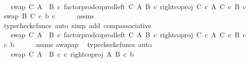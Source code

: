 \begin{isabellebody}
\ \ \isamarkupfalse%
\ \isamarkupfalse%
\ {\isachardoublequoteopen}{\isachardot}{\kern0pt}{\isachardot}{\kern0pt}{\isachardot}{\kern0pt}\ {\isacharequal}{\kern0pt}\ swap\ C\ {\isacharparenleft}{\kern0pt}A\ {\isasymCoprod}\ B{\isacharparenright}{\kern0pt}\ {\isasymcirc}\isactrlsub c\ factor{\isacharunderscore}{\kern0pt}prod{\isacharunderscore}{\kern0pt}coprod{\isacharunderscore}{\kern0pt}left\ C\ A\ B\ {\isasymcirc}\isactrlsub c\ right{\isacharunderscore}{\kern0pt}coproj\ {\isacharparenleft}{\kern0pt}C\ {\isasymtimes}\isactrlsub c\ A{\isacharparenright}{\kern0pt}\ {\isacharparenleft}{\kern0pt}C\ {\isasymtimes}\isactrlsub c\ B{\isacharparenright}{\kern0pt}\ {\isasymcirc}\isactrlsub c\ swap\ B\ C\ {\isasymcirc}\isactrlsub c\ {\isasymlangle}b{\isacharcomma}{\kern0pt}\ c{\isasymrangle}{\isachardoublequoteclose}\isanewline
\ \ \ \ \isamarkupfalse%
\ assms\ \isamarkupfalse%
\ {\isacharparenleft}{\kern0pt}typecheck{\isacharunderscore}{\kern0pt}cfuncs{\isacharcomma}{\kern0pt}\ auto\ simp\ add{\isacharcolon}{\kern0pt}\ comp{\isacharunderscore}{\kern0pt}associative{}{\isacharparenright}{\kern0pt}\isanewline
\ \ \isamarkupfalse%
\ \isamarkupfalse%
\ {\isachardoublequoteopen}{\isachardot}{\kern0pt}{\isachardot}{\kern0pt}{\isachardot}{\kern0pt}\ {\isacharequal}{\kern0pt}\ swap\ C\ {\isacharparenleft}{\kern0pt}A\ {\isasymCoprod}\ B{\isacharparenright}{\kern0pt}\ {\isasymcirc}\isactrlsub c\ factor{\isacharunderscore}{\kern0pt}prod{\isacharunderscore}{\kern0pt}coprod{\isacharunderscore}{\kern0pt}left\ C\ A\ B\ {\isasymcirc}\isactrlsub c\ right{\isacharunderscore}{\kern0pt}coproj\ {\isacharparenleft}{\kern0pt}C\ {\isasymtimes}\isactrlsub c\ A{\isacharparenright}{\kern0pt}\ {\isacharparenleft}{\kern0pt}C\ {\isasymtimes}\isactrlsub c\ B{\isacharparenright}{\kern0pt}\ {\isasymcirc}\isactrlsub c\ {\isasymlangle}c{\isacharcomma}{\kern0pt}\ b{\isasymrangle}{\isachardoublequoteclose}\isanewline
\ \ \ \ \isamarkupfalse%
\ assms\ swap{\isacharunderscore}{\kern0pt}ap\ \isamarkupfalse%
\ {\isacharparenleft}{\kern0pt}typecheck{\isacharunderscore}{\kern0pt}cfuncs{\isacharcomma}{\kern0pt}\ auto{\isacharparenright}{\kern0pt}\isanewline
\ \ \isamarkupfalse%
\ \isamarkupfalse%
\ {\isachardoublequoteopen}{\isachardot}{\kern0pt}{\isachardot}{\kern0pt}{\isachardot}{\kern0pt}\ {\isacharequal}{\kern0pt}\ swap\ C\ {\isacharparenleft}{\kern0pt}A\ {\isasymCoprod}\ B{\isacharparenright}{\kern0pt}\ {\isasymcirc}\isactrlsub c\ {\isasymlangle}c{\isacharcomma}{\kern0pt}\ right{\isacharunderscore}{\kern0pt}coproj\ A\ B\ {\isasymcirc}\isactrlsub c\ b{\isasymrangle}{\isachardoublequoteclose}\isanewline

\end{isabellebody}

